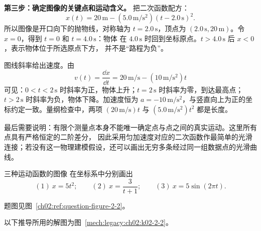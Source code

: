 {\begin{xesolution}
\textbf{第三步：确定图像的关键点和运动含义。}
把二次函数配方：
\[
 x(t)=20\,\mathrm m
 -(5.0\,\mathrm{m/s^2})(t-2.0\,\mathrm s)^2.
\]
所以图像是开口向下的抛物线，对称轴为 $t=2.0\,\mathrm s$，顶点为
$(2.0\,\mathrm s,20\,\mathrm m)$。令 $x=0$，得到 $t=0$ 和 $t=4.0\,\mathrm s$：物体
在 $4.0\,\mathrm s$ 时回到坐标原点。$t>4.0\,\mathrm s$ 后 $x<0$，表示物体位于所选原点下方，
并不是“路程为负”。

图线斜率给出速度。由
\[
 v(t)=\frac{\dd x}{\dd t}
 =20\,\mathrm{m/s}-(10\,\mathrm{m/s^2})t
\]
可见：$0<t<2\,\mathrm s$ 时斜率为正，物体上升；$t=2\,\mathrm s$ 时斜率为零，到达最高点；
$t>2\,\mathrm s$ 时斜率为负，物体下降。加速度恒为
$a=-10\,\mathrm{m/s^2}$，与竖直向上为正的坐标约定一致。量纲检查中，两项
$(20\,\mathrm{m/s})t$ 与 $(5.0\,\mathrm{m/s^2})t^2$ 都是长度。

最后需要说明：有限个测量点本身不能唯一确定点与点之间的真实运动。这里所有点具有严格恒定的二阶差分，
因此采用匀加速度对应的二次函数作最简单的光滑连接；若没有这一物理建模假设，还可以画出无穷多条经过同一组数据点的光滑曲线。
\begin{center}\begin{qualityfigure}
\label{mech:legacy:ch02:k02-2-1}
\end{qualityfigure}\end{center}
\end{xesolution}

\begin{origexamplebox}{三种运动函数的图像}\label{ch02:ex:k02-2-2}
在坐标系中分别画出
\[
  (1)\ x=5t^2;\qquad (2)\ x=\frac{3}{t+1};\qquad
  (3)\ x=5\sin(2\pi t).
\]
\par 题图见图~\ref{ch02:ref:question-figure-2-2}。
\KQuestionAC
\end{origexamplebox}
\begin{xesolution}
以下推导所用的解图为图~\ref{mech:legacy:ch02:k02-2-2}。


\end{xesolution}}
